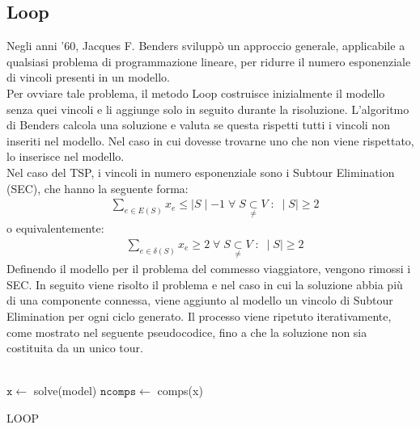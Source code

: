 \subsection{Loop}
Negli anni '60, Jacques F. Benders sviluppò un approccio generale, applicabile a qualsiasi problema di programmazione lineare, per ridurre il numero esponenziale di vincoli presenti in un modello.\\
Per ovviare tale problema, il metodo Loop costruisce inizialmente il modello senza quei vincoli e li aggiunge solo in seguito durante la risoluzione. L'algoritmo di Benders calcola una soluzione e valuta se questa rispetti tutti i vincoli non inseriti nel modello. Nel caso in cui dovesse trovarne uno che non viene rispettato, lo inserisce nel modello.\\ 
Nel caso del TSP, i vincoli in numero esponenziale sono i Subtour Elimination (SEC), che hanno la seguente forma:
\begin{align}
&\underset{e\in E(S)}\sum{x_{e}} \leq \mid S\mid - 1\;\forall\;S\underset{\neq}{\subset}V\; : \; \mid S\mid\geq 2
\end{align}
o equivalentemente:
\begin{align}
&\underset{e\in \delta(S)}\sum{x_{e}}\geq 2\;\forall\;S\underset{\neq}{\subset}V\; : \; \mid S\mid\geq 2
\end{align}
Definendo il modello per il problema del commesso viaggiatore, vengono rimossi i SEC. In seguito viene risolto il problema e nel caso in cui la soluzione abbia più di una componente connessa, viene aggiunto al modello un vincolo di Subtour Elimination per ogni ciclo generato. Il processo viene ripetuto iterativamente, come mostrato nel seguente pseudocodice, fino a che la soluzione non sia costituita da un unico tour.\\\\
\begin{algorithm}[H]
\DontPrintSemicolon
{}
\BlankLine 
 $\mathtt{x} \gets$ solve(model)\;
 $\mathtt{ncomps} \gets$ comps(x)\;
 \BlankLine 
 \caption{LOOP}
\end{algorithm}
